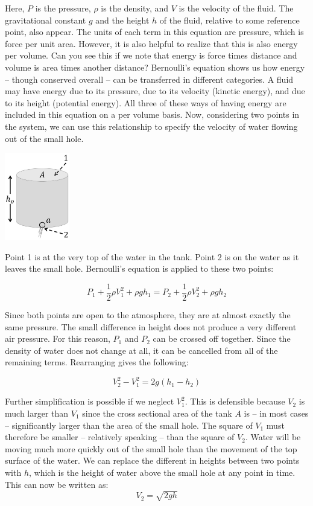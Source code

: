 \documentclass{ximera}
\begin{document}
Here, $P$ is the pressure, $\rho$  is the density, and $V$ is the velocity of the fluid.  The gravitational constant $g$ and the height $h$ of the fluid, relative to some reference point, also appear.
The units of each term in this equation are pressure, which is force per unit area.  However, it is also helpful to realize that this is also energy per volume.  Can you see this if we note that energy is force times distance and volume is area times another distance?  Bernoulli’s equation shows us how energy – though conserved overall – can be transferred in different categories.  A fluid may have energy due to its pressure, due to its velocity (kinetic energy), and due to its height (potential energy).  All three of these ways of having energy are included in this equation on a per volume basis.  Now, considering two points in the system, we can use this relationship to specify the velocity of water flowing out of the small hole.  
\begin{image}
 \includegraphics[height=1.5in]{drainingTank2.jpg}
\end{image}

Point 1 is at the very top of the water in the tank.  Point 2 is on the water as it leaves the small hole.  Bernoulli’s equation is applied to these two points: 

$$P_1+\frac{1}{2}\rho V_1^2+\rho gh_1=P_2+\frac{1}{2}\rho V_2^2+\rho gh_2$$

Since both points are open to the atmosphere, they are at almost exactly the same pressure.  The small difference in height does not produce a very different air pressure.  For this reason, $P_1$ and $P_2$ can be crossed off together.  Since the density  of water does not change at all, it can be cancelled from all of the remaining terms.  Rearranging gives the following:

$$V_2^2-V_1^2=2g(h_1-h_2)$$

Further simplification is possible if we neglect $V_1^2$.  This is defensible because $V_2$ is much larger than $V_1$ since the cross sectional area of the tank $A$ is – in most cases – significantly larger than the area of the small hole.  The square of $V_1$  must therefore be smaller – relatively speaking – than the square of $V_2$. Water will be moving much more quickly out of the small hole than the movement of the top surface of the water.  We can replace the different in heights between two points with $h$, which is the height of water above the small hole at any point in time.  This can now be written as:
 $$V_2=\sqrt{2gh}$$
 
\end{document}
